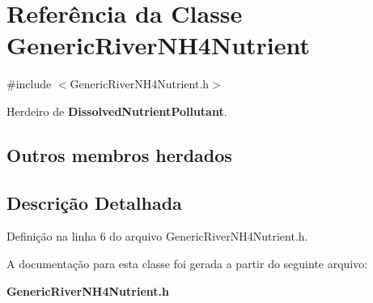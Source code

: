 \section{Referência da Classe Generic\+River\+N\+H4\+Nutrient}
\label{class_generic_river_n_h4_nutrient}


{\ttfamily \#include $<$Generic\+River\+N\+H4\+Nutrient.\+h$>$}



Herdeiro de {\bf Dissolved\+Nutrient\+Pollutant}.

\subsection*{Outros membros herdados}


\subsection{Descrição Detalhada}


Definição na linha 6 do arquivo Generic\+River\+N\+H4\+Nutrient.\+h.



A documentação para esta classe foi gerada a partir do seguinte arquivo\+:\begin{DoxyCompactItemize}
\item 
{\bf Generic\+River\+N\+H4\+Nutrient.\+h}\end{DoxyCompactItemize}
